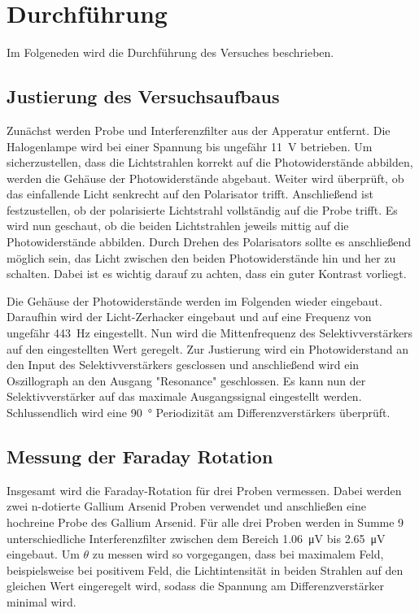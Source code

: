 \section{Durchführung}
\label{sec:durchführung}

Im Folgeneden wird die Durchführung des Versuches beschrieben.

\subsection{Justierung des Versuchsaufbaus}
\label{sec:Justierung}

Zunächst werden Probe und Interferenzfilter aus der Apperatur entfernt. Die Halogenlampe wird bei einer
Spannung bis ungefähr \qty{11}{\volt} betrieben. Um sicherzustellen, dass die Lichtstrahlen korrekt auf die 
Photowiderstände abbilden, werden die Gehäuse der Photowiderstände abgebaut.
Weiter wird überprüft, ob das einfallende Licht senkrecht auf den Polarisator trifft.
Anschließend ist festzustellen, ob der polarisierte Lichtstrahl vollständig auf die Probe trifft.
Es wird nun geschaut, ob die beiden Lichtstrahlen jeweils mittig auf die Photowiderstände abbilden.
Durch Drehen des Polarisators sollte es anschließend möglich sein, das Licht zwischen den beiden Photowiderstände
hin und her zu schalten. Dabei ist es wichtig darauf zu achten, dass ein guter Kontrast vorliegt.

Die Gehäuse der Photowiderstände werden im Folgenden wieder eingebaut.
Daraufhin wird der Licht-Zerhacker eingebaut und auf eine Frequenz von ungefähr
\qty{443}{\hertz} eingestellt. Nun wird die Mittenfrequenz des Selektivverstärkers auf den eingestellten Wert geregelt.
Zur Justierung wird ein Photowiderstand an den Input des Selektivverstärkers gesclossen und anschließend
wird ein Oszillograph an den Ausgang "Resonance" geschlossen. Es kann nun der Selektivverstärker auf
das maximale Ausgangssignal eingestellt werden.
Schlussendlich wird eine \qty{90}{\degree} Periodizität am Differenzverstärkers überprüft.

\subsection{Messung der Faraday Rotation}
\label{sec:Faraday Rotation}

Insgesamt wird die Faraday-Rotation für drei Proben vermessen. Dabei werden zwei n-dotierte Gallium Arsenid Proben 
verwendet und anschließen eine hochreine Probe des Gallium Arsenid.
Für alle drei Proben werden in Summe 9 unterschiedliche Interferenzfilter zwischen dem Bereich \qty{1.06}{\micro\volt} 
bis \qty{2.65}{\micro\volt} eingebaut. Um $ \theta $ zu messen wird so vorgegangen, dass bei maximalem Feld, beispielsweise bei
positivem Feld, die Lichtintensität in beiden Strahlen auf den gleichen Wert eingeregelt wird, sodass die Spannung am Differenzverstärker
minimal wird.

